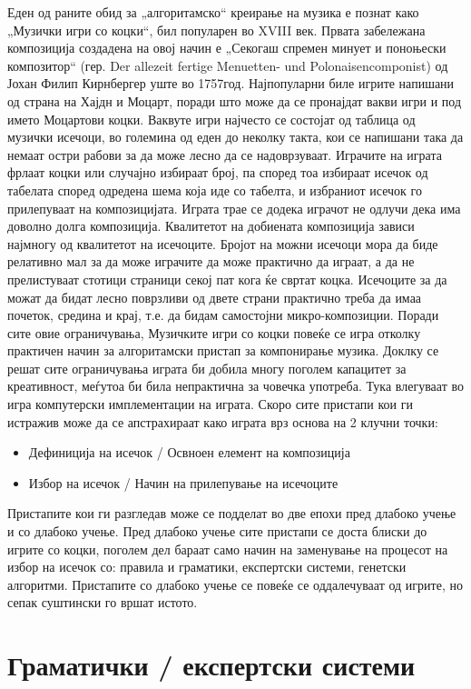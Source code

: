 Еден од раните обид за „алгоритамско“ креирање на музика е познат како „Музички игри со коцки“, бил популарен во XVIII век. Првата забележана композиција создадена на овој начин е „Секогаш спремен минует и поноњески композитор“ (гер. Der allezeit fertige Menuetten- und Polonaisencomponist) од Јохан Филип Кирнбергер уште во 1757год. Најпопуларни биле игрите напишани од страна на Хајдн и Моцарт, поради што може да се пронајдат вакви игри и под името Моцартови коцки. Ваквуте игри најчесто се состојат од таблица од музички исечоци, во големина од еден до неколку такта, кои се напишани така да немаат остри рабови за да може лесно да се надоврзуваат. Играчите на играта фрлаат коцки или случајно избираат број, па според тоа избираат исечок од табелата според одредена шема која иде со табелта, и избраниот исечок го прилепуваат на композицијата. Играта трае се додека играчот не одлучи дека има доволно долга композиција. Квалитетот на добиената композиција зависи најмногу од квалитетот на исечоците. Бројот на можни исечоци мора да биде релативно мал за да може играчите да може практично да играат, а да не прелистуваат стотици страници секој пат кога ќе свртат коцка. Исечоците за да можат да бидат лесно поврзливи од двете страни практично треба да имаа почеток, средина и крај, т.е. да бидам самостојни микро-композиции. Поради сите овие ограничувања, Музичките игри со коцки повеќе се игра отколку практичен начин за алгоритамски пристап за компонирање музика. Доклку се решат сите ограничувања играта би добила многу поголем капацитет за креативност, меѓутоа би била непрактична за човечка употреба. Тука влегуваат во игра компутерски имплементации на играта. Скоро сите пристапи кои ги истражив може да се апстрахираат како играта врз основа на 2 клучни точки:
\begin{itemize}
    \item Дефиниција на исечок / Освноен елемент на композиција 
    \item Избор на исечок / Начин на прилепување на исечоците
\end{itemize}
Пристапите кои ги разгледав може се подделат во две епохи пред длабоко учење и со длабоко учење. Пред длабоко учење сите пристапи се доста блиски до игрите со коцки, поголем дел бараат само начин на заменување на процесот на избор на исечок со: правила и граматики, експертски системи, генетски алгоритми. Пристапите со длабоко учење се повеќе се оддалечуваат од игрите, но сепак суштински го вршат истото. 

\section{Граматички / експертски системи} 

